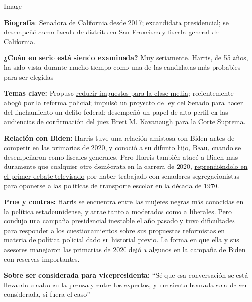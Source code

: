 Image

\textbf{Biografía:} Senadora de California desde 2017; excandidata
presidencial; se desempeñó como fiscala de distrito en San Francisco y
fiscala general de California.

\textbf{¿Cuán en serio está siendo examinada?} Muy seriamente. Harris,
de 55 años, ha sido vista durante mucho tiempo como una de las
candidatas más probables para ser elegidas.

\textbf{Temas clave:} Propuso
\href{https://www.nytimes3xbfgragh.onion/2019/05/01/us/politics/cory-booker-kamala-harris-2020.html}{reducir
impuestos para la clase media}; recientemente abogó por la reforma
policial; impulsó un proyecto de ley del Senado para hacer del
linchamiento un delito federal; desempeñó un papel de alto perfil en las
audiencias de confirmación del juez Brett M. Kavanaugh para la Corte
Suprema.

\textbf{Relación con Biden:} Harris tuvo una relación amistosa con Biden
antes de competir en las primarias de 2020, y conoció a su difunto hijo,
Beau, cuando se desempeñaron como fiscales generales. Pero Harris
también atacó a Biden más duramente que cualquier otro demócrata en la
carrera de 2020,
\href{https://www.nytimes3xbfgragh.onion/2019/07/31/us/politics/kamala-harris-biden-busing.html}{reprendiéndolo
en el primer debate televisado} por haber trabajado con senadores
segregacionistas
\href{https://www.nytimes3xbfgragh.onion/2019/07/15/us/politics/biden-busing.html?action=click\&module=RelatedLinks\&pgtype=Article}{para
oponerse a las políticas de transporte escolar} en la década de 1970.

\textbf{Pros y contras:} Harris se encuentra entre las mujeres negras
más conocidas en la política estadounidense, y atrae tanto a moderados
como a liberales. Pero
\href{https://www.nytimes3xbfgragh.onion/2019/11/29/us/politics/kamala-harris-2020.html}{condujo
una campaña presidencial inestable} el año pasado y tuvo dificultades
para responder a los cuestionamientos sobre sus propuestas reformistas
en materia de política policial
\href{https://www.nytimes3xbfgragh.onion/2019/09/09/us/politics/kamala-harris-criminal-justice.html}{dado
su historial previo}. La forma en que ella y sus asesores manejaron las
primarias de 2020 dejó a algunos en la campaña de Biden con reservas
importantes.

\textbf{Sobre ser considerada para vicepresidenta:} ``Sé que esa
conversación se está llevando a cabo en la prensa y entre los expertos,
y me siento honrada solo de ser considerada, si fuera el caso''.


